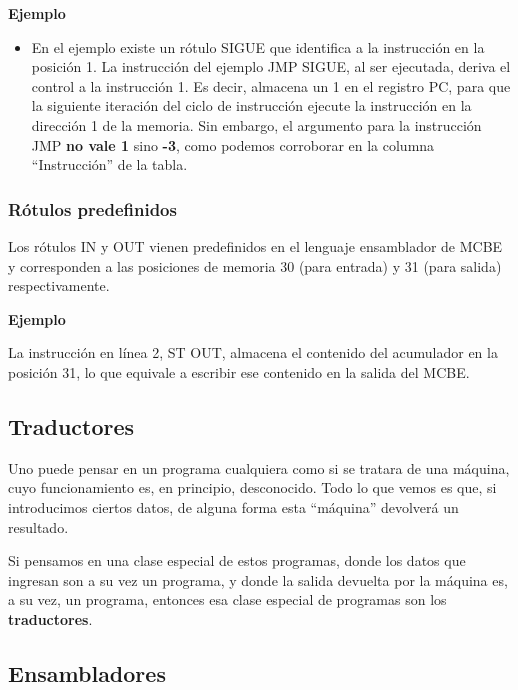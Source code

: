 \documentclass[spanish,a4paper,]{article}
\providecommand{\tightlist}{%
  \setlength{\itemsep}{0pt}\setlength{\parskip}{0pt}}
\begin{document}
\textbf{Ejemplo}

\begin{itemize}
\tightlist
\item
  En el ejemplo existe un rótulo SIGUE que identifica a la instrucción
  en la posición 1. La instrucción del ejemplo JMP SIGUE, al ser
  ejecutada, deriva el control a la instrucción 1. Es decir, almacena un
  1 en el registro PC, para que la siguiente iteración del ciclo de
  instrucción ejecute la instrucción en la dirección 1 de la memoria.
  Sin embargo, el argumento para la instrucción JMP \textbf{no vale 1}
  sino \textbf{-3}, como podemos corroborar en la columna
  ``Instrucción'' de la tabla.
\end{itemize}

\hypertarget{ruxf3tulos-predefinidos}{%
\subsubsection{Rótulos predefinidos}\label{ruxf3tulos-predefinidos}}

Los rótulos IN y OUT vienen predefinidos en el lenguaje ensamblador de
MCBE y corresponden a las posiciones de memoria 30 (para entrada) y 31
(para salida) respectivamente.

\textbf{Ejemplo}

La instrucción en línea 2, ST OUT, almacena el contenido del acumulador
en la posición 31, lo que equivale a escribir ese contenido en la salida
del MCBE.

\hypertarget{traductores}{%
\subsection{Traductores}\label{traductores}}

Uno puede pensar en un programa cualquiera como si se tratara de una
máquina, cuyo funcionamiento es, en principio, desconocido. Todo lo que
vemos es que, si introducimos ciertos datos, de alguna forma esta
``máquina'' devolverá un resultado.

Si pensamos en una clase especial de estos programas, donde los datos
que ingresan son a su vez un programa, y donde la salida devuelta por la
máquina es, a su vez, un programa, entonces esa clase especial de
programas son los \textbf{traductores}.

\hypertarget{ensambladores}{%
\subsection{Ensambladores}\label{ensambladores}}
\end{document}
